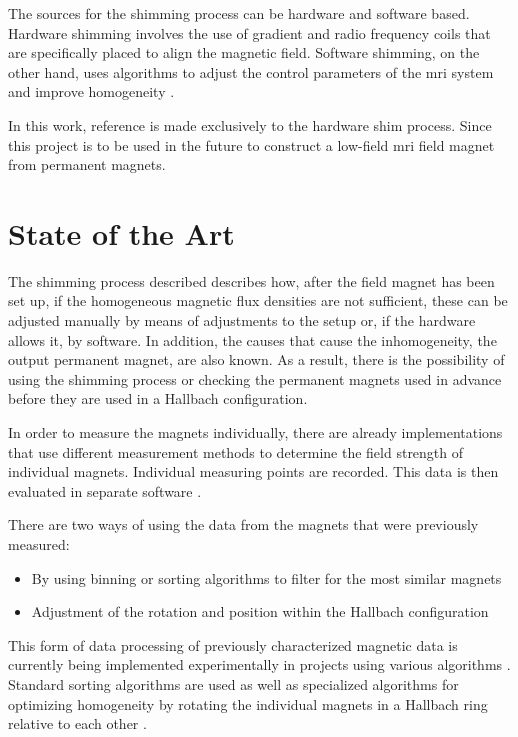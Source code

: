 The sources for the shimming process can be hardware and software based.
Hardware shimming involves the use of gradient and radio frequency coils
that are specifically placed to align the magnetic field. Software
shimming, on the other hand, uses algorithms to adjust the control
parameters of the \gls{mri} system and improve homogeneity
\cite{10.3389/fphy.2021.704566}.

In this work, reference is made exclusively to the hardware shim
process. Since this project is to be used in the future to construct a
low-field \gls{mri} field magnet from permanent magnets.

\hypertarget{state-of-the-art}{%
\section{State of the Art}\label{state-of-the-art}}

The shimming process described describes how, after the field magnet has
been set up, if the homogeneous magnetic flux densities are not
sufficient, these can be adjusted manually by means of adjustments to
the setup or, if the hardware allows it, by software. In addition, the
causes that cause the inhomogeneity, the output permanent magnet, are
also known. As a result, there is the possibility of using the shimming
process or checking the permanent magnets used in advance before they
are used in a Hallbach configuration.

In order to measure the magnets individually, there are already
implementations that use different measurement methods to determine the
field strength of individual magnets. Individual measuring points are
recorded. This data is then evaluated in separate software
\cite{Wickenbrock_2021}.

There are two ways of using the data from the magnets that were
previously measured:

\begin{itemize}
\tightlist
\item
  By using binning or sorting algorithms to filter for the most similar
  magnets
\item
  Adjustment of the rotation and position within the Hallbach
  configuration
\end{itemize}

This form of data processing of previously characterized magnetic data
is currently being implemented experimentally in projects using various
algorithms \cite{Wickenbrock_2021}. Standard sorting algorithms are
used as well as specialized algorithms for optimizing homogeneity by
rotating the individual magnets in a Hallbach ring relative to each
other \cite{HalbachMRIDesigner}.

